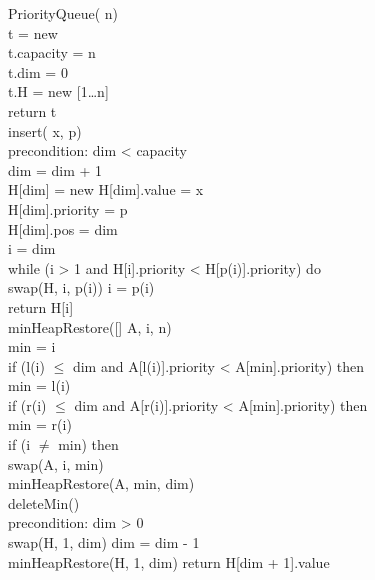 \begin{codecont}
    \ind{} PriorityQueue( n)\\
         t = new \\
        t.capacity = n\\
        t.dim = 0\\
        t.H = new [1\dots n]\\
        return t\\

    \ind{} insert( x,  p)\\
        precondition: dim < capacity\\
        dim = dim + 1\\
        H[dim] = new \hfill{}
        H[dim].value = x\\
        H[dim].priority = p\\
        H[dim].pos = dim\\
         i = dim\\
        \indf while (i > 1 and H[i].priority < H[p(i)].priority) do\\
            \indff swap(H, i, p(i))\hfill{}
            \indff i = p(i)\\
        \indf return H[i]\\

    \ind minHeapRestore([] A,  i,  n)\\
         min = i\\
        if (l(i) $\leq$ dim and A[l(i)].priority < A[min].priority) then\\
            \indf min = l(i)\\
        \ind if (r(i) $\leq$ dim and A[r(i)].priority < A[min].priority) then\\
            \indf min = r(i)\\
        \ind if (i $\neq$ min) then\\
            \indf swap(A, i, min)\\
            \indf minHeapRestore(A, min, dim)\\

    \ind{} deleteMin()\\
        precondition: dim > 0\\
        swap(H, 1, dim)\hfill{}
        dim = dim - 1\\
        minHeapRestore(H, 1, dim)\hfill{}
        return H[dim + 1].value\hfill{}


\end{codecont}
